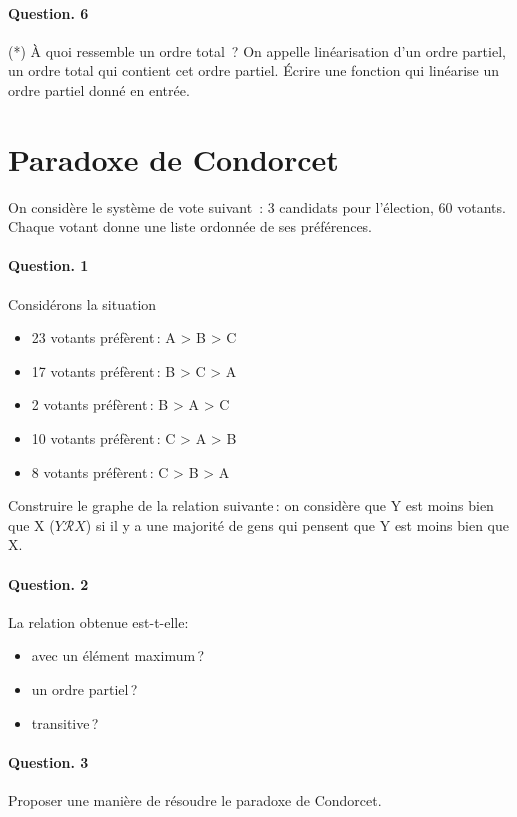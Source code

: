 \documentclass[10pt,a4paper]{article}
\begin{document}
\paragraph{Question. 6\\}
(*) À quoi ressemble un ordre total~? On appelle linéarisation d'un ordre
partiel, un ordre total qui contient cet ordre partiel. Écrire une
fonction qui linéarise un ordre partiel donné en entrée.
 
\section{Paradoxe de Condorcet}
On considère le système de vote suivant~: 3 candidats pour l'élection,
60 votants. Chaque votant donne une liste ordonnée de ses préférences.
\paragraph{Question. 1\\}
Considérons la situation         
\begin{itemize}
\item 23 votants préfèrent\,: A > B > C
\item 17 votants préfèrent\,: B > C > A
\item 2 votants préfèrent\,: B > A > C
\item 10 votants préfèrent\,: C > A > B
\item 8 votants préfèrent\,: C > B > A
\end{itemize}
Construire le graphe de la relation suivante\,: on considère que Y est moins 
bien que X ($Y\mathcal{R}X$) si il y a une majorité de gens qui pensent que Y 
est moins bien que X.
\paragraph{Question. 2\\}
La relation obtenue est-t-elle:
\begin{itemize}
\item avec un élément maximum\,?
\item un ordre partiel\,?
\item transitive\,?
\end{itemize}
\paragraph{Question. 3\\}
Proposer une manière de résoudre le paradoxe de Condorcet.
\end{document}
